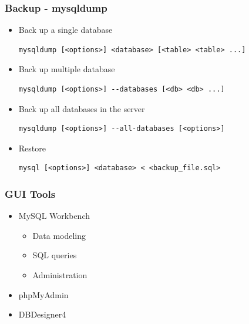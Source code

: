 \documentclass{beamer}
\begin{document}

\begin{frame}[fragile]
\frametitle{Backup - mysqldump}

\begin{itemize}
\item Back up a single database
\begin{verbatim}
mysqldump [<options>] <database> [<table> <table> ...]

\end{verbatim}

\item Back up multiple database
\begin{verbatim}
mysqldump [<options>] --databases [<db> <db> ...]

\end{verbatim}

\item Back up all databases in the server
\begin{verbatim}
mysqldump [<options>] --all-databases [<options>]

\end{verbatim}

\item Restore
\begin{verbatim}
mysql [<options>] <database> < <backup_file.sql>

\end{verbatim}
\end{itemize}

\end{frame}


\begin{frame}
\frametitle{GUI Tools}

\begin{itemize}

\item MySQL Workbench
\begin{itemize}
\item Data modeling
\item SQL queries
\item Administration
\end{itemize}

\item phpMyAdmin
\item DBDesigner4

\end{itemize}

\end{frame}
\end{document}
